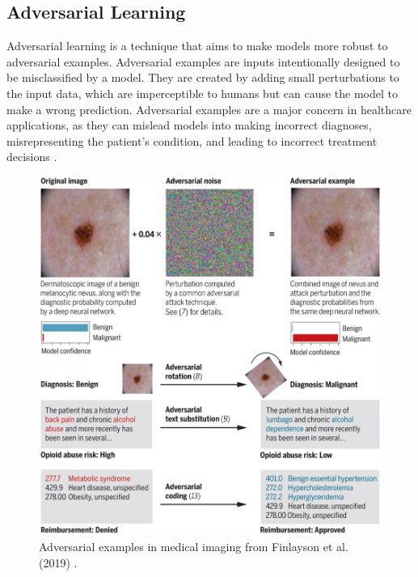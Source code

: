\documentclass[../main.tex]{subfiles}
\begin{document}
    \subsection{Adversarial Learning} \label{sec:adversarial_training}

    Adversarial learning is a technique that aims to make models more robust to adversarial examples. Adversarial examples are inputs intentionally designed to be misclassified by a model. They are created by adding small perturbations to the input data, which are imperceptible to humans but can cause the model to make a wrong prediction. Adversarial examples are a major concern in healthcare applications, as they can mislead models into making incorrect diagnoses, misrepresenting the patient's condition, and leading to incorrect treatment decisions \cite{finlayson_adversarial_2019}.

    \begin{figure}[h]
        \includegraphics[width=0.65\linewidth]{figures/medical-adversarial-attacks.jpeg}
        \caption{Adversarial examples in medical imaging from Finlayson et al. (2019) \cite{finlayson_adversarial_2019}.}
    \end{figure}
\end{document}
